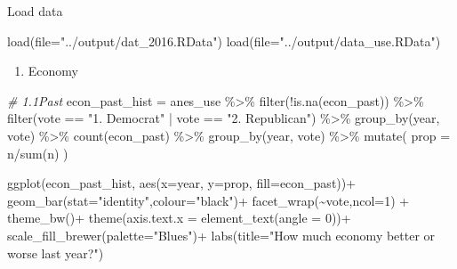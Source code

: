 \documentclass[
]{article}
\newenvironment{Shaded}{\begin{snugshade}}{\end{snugshade}}
\newcommand{\AttributeTok}[1]{\textcolor[rgb]{0.77,0.63,0.00}{#1}}
\newcommand{\CommentTok}[1]{\textcolor[rgb]{0.56,0.35,0.01}{\textit{#1}}}
\newcommand{\DecValTok}[1]{\textcolor[rgb]{0.00,0.00,0.81}{#1}}
\newcommand{\FunctionTok}[1]{\textcolor[rgb]{0.00,0.00,0.00}{#1}}
\newcommand{\NormalTok}[1]{#1}
\newcommand{\OtherTok}[1]{\textcolor[rgb]{0.56,0.35,0.01}{#1}}
\newcommand{\SpecialCharTok}[1]{\textcolor[rgb]{0.00,0.00,0.00}{#1}}
\newcommand{\StringTok}[1]{\textcolor[rgb]{0.31,0.60,0.02}{#1}}
\providecommand{\tightlist}{%
  \setlength{\itemsep}{0pt}\setlength{\parskip}{0pt}}
\begin{document}
Load data

\begin{Shaded}
\begin{Highlighting}[]
\FunctionTok{load}\NormalTok{(}\AttributeTok{file=}\StringTok{"../output/dat\_2016.RData"}\NormalTok{)}
\FunctionTok{load}\NormalTok{(}\AttributeTok{file=}\StringTok{"../output/data\_use.RData"}\NormalTok{)}
\end{Highlighting}
\end{Shaded}

\begin{enumerate}
\def\labelenumi{\arabic{enumi}.}
\tightlist
\item
  Economy
\end{enumerate}

\begin{Shaded}
\begin{Highlighting}[]
\CommentTok{\# 1.1Past}
\NormalTok{econ\_past\_hist }\OtherTok{=}\NormalTok{ anes\_use }\SpecialCharTok{\%\textgreater{}\%}
  \FunctionTok{filter}\NormalTok{(}\SpecialCharTok{!}\FunctionTok{is.na}\NormalTok{(econ\_past))  }\SpecialCharTok{\%\textgreater{}\%}
  \FunctionTok{filter}\NormalTok{(vote }\SpecialCharTok{==} \StringTok{"1. Democrat"} \SpecialCharTok{|}\NormalTok{ vote }\SpecialCharTok{==} \StringTok{"2. Republican"}\NormalTok{) }\SpecialCharTok{\%\textgreater{}\%}
  \FunctionTok{group\_by}\NormalTok{(year, vote) }\SpecialCharTok{\%\textgreater{}\%}
  \FunctionTok{count}\NormalTok{(econ\_past) }\SpecialCharTok{\%\textgreater{}\%}
  \FunctionTok{group\_by}\NormalTok{(year, vote) }\SpecialCharTok{\%\textgreater{}\%}
  \FunctionTok{mutate}\NormalTok{(}
    \AttributeTok{prop =}\NormalTok{ n}\SpecialCharTok{/}\FunctionTok{sum}\NormalTok{(n)}
\NormalTok{  )}
 

\FunctionTok{ggplot}\NormalTok{(econ\_past\_hist,}
       \FunctionTok{aes}\NormalTok{(}\AttributeTok{x=}\NormalTok{year, }\AttributeTok{y=}\NormalTok{prop, }\AttributeTok{fill=}\NormalTok{econ\_past))}\SpecialCharTok{+}
  \FunctionTok{geom\_bar}\NormalTok{(}\AttributeTok{stat=}\StringTok{"identity"}\NormalTok{,}\AttributeTok{colour=}\StringTok{"black"}\NormalTok{)}\SpecialCharTok{+}
  \FunctionTok{facet\_wrap}\NormalTok{(}\SpecialCharTok{\textasciitilde{}}\NormalTok{vote,}\AttributeTok{ncol=}\DecValTok{1}\NormalTok{) }\SpecialCharTok{+}
  \FunctionTok{theme\_bw}\NormalTok{()}\SpecialCharTok{+}
  \FunctionTok{theme}\NormalTok{(}\AttributeTok{axis.text.x =} \FunctionTok{element\_text}\NormalTok{(}\AttributeTok{angle =} \DecValTok{0}\NormalTok{))}\SpecialCharTok{+}
  \FunctionTok{scale\_fill\_brewer}\NormalTok{(}\AttributeTok{palette=}\StringTok{"Blues"}\NormalTok{)}\SpecialCharTok{+}
  \FunctionTok{labs}\NormalTok{(}\AttributeTok{title=}\StringTok{"How much economy better or worse last year?"}\NormalTok{)}
\end{Highlighting}
\end{Shaded}
\end{document}
